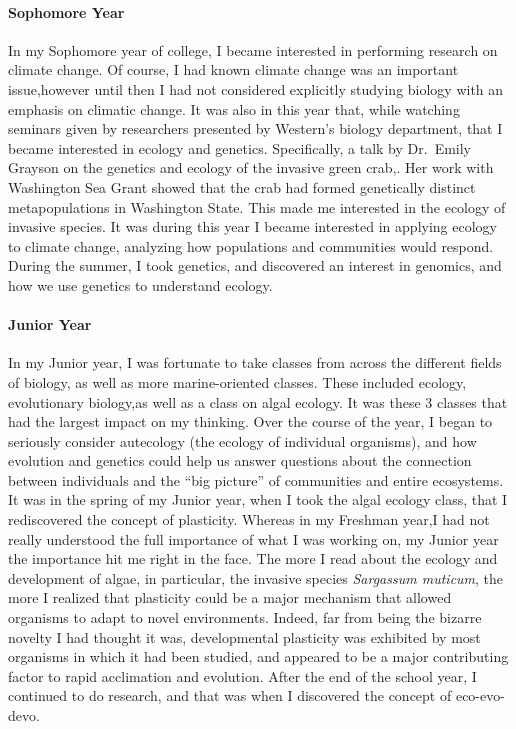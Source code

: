 \documentclass{article}
\begin{document}
\hypertarget{sophomore-year}{%
\paragraph{Sophomore Year}\label{sophomore-year}}

In my Sophomore year of college, I became interested in performing
research on climate change. Of course, I had known climate change was an
important issue,however until then I had not considered explicitly
studying biology with an emphasis on climatic change. It was also in
this year that, while watching seminars given by researchers presented
by Western's biology department, that I became interested in ecology and
genetics. Specifically, a talk by Dr.~Emily Grayson on the genetics and
ecology of the invasive green crab,. Her work with Washington Sea Grant
showed that the crab had formed genetically distinct metapopulations in
Washington State. This made me interested in the ecology of invasive
species. It was during this year I became interested in applying ecology
to climate change, analyzing how populations and communities would
respond. During the summer, I took genetics, and discovered an interest
in genomics, and how we use genetics to understand ecology.

\hypertarget{junior-year}{%
\paragraph{Junior Year}\label{junior-year}}

In my Junior year, I was fortunate to take classes from across the
different fields of biology, as well as more marine-oriented classes.
These included ecology, evolutionary biology,as well as a class on algal
ecology. It was these 3 classes that had the largest impact on my
thinking. Over the course of the year, I began to seriously consider
autecology (the ecology of individual organisms), and how evolution and
genetics could help us answer questions about the connection between
individuals and the ``big picture'' of communities and entire
ecosystems. It was in the spring of my Junior year, when I took the
algal ecology class, that I rediscovered the concept of plasticity.
Whereas in my Freshman year,I had not really understood the full
importance of what I was working on, my Junior year the importance hit
me right in the face. The more I read about the ecology and development
of algae, in particular, the invasive species \emph{Sargassum muticum},
the more I realized that plasticity could be a major mechanism that
allowed organisms to adapt to novel environments. Indeed, far from being
the bizarre novelty I had thought it was, developmental plasticity was
exhibited by most organisms in which it had been studied, and appeared
to be a major contributing factor to rapid acclimation and evolution.
After the end of the school year, I continued to do research, and that
was when I discovered the concept of eco-evo-devo.
\end{document}
